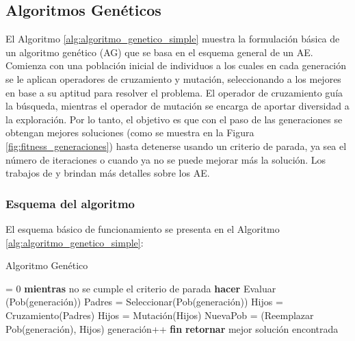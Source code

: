 \subsection{Algoritmos Genéticos}
El Algoritmo \ref{alg:algoritmo_genetico_simple} muestra la formulación básica de un algoritmo genético (AG) que se basa en el esquema general de un AE. Comienza con una población inicial de individuos a los cuales en cada generación se le aplican operadores de cruzamiento y mutación, seleccionando a los mejores en base a su aptitud para resolver el problema. El operador de cruzamiento guía la búsqueda, mientras el operador de mutación se encarga de aportar diversidad a la exploración. Por lo tanto, el objetivo es que con el paso de las generaciones se obtengan mejores soluciones (como se muestra en la Figura \ref{fig:fitness_generaciones}) hasta detenerse usando un criterio de parada, ya sea el número de iteraciones o cuando ya no se puede mejorar más la solución. Los trabajos de \citet{Goldberg1989} y \citet{Mitchell1996} brindan más detalles sobre los AE.

\subsubsection{Esquema del algoritmo}

El esquema básico de funcionamiento se presenta en el Algoritmo \ref{alg:algoritmo_genetico_simple}:


\begin{algorithm}[ht]
	\caption{Algoritmo Genético}
	\label{alg:algoritmo_genetico_simple}
	\begin{algorithmic} [1] 
		{
			 = 0
			\STATE \textbf{mientras} {no se cumple el criterio de parada} \textbf{hacer}
			\STATE\hspace{\algorithmicindent} {Evaluar (Pob(generación))}
			\STATE\hspace{\algorithmicindent} {Padres = Seleccionar(Pob(generación))}
			\STATE\hspace{\algorithmicindent} {Hijos = Cruzamiento(Padres)}
			\STATE\hspace{\algorithmicindent} {Hijos = Mutación(Hijos)}
			\STATE\hspace{\algorithmicindent} {NuevaPob = (Reemplazar Pob(generación), Hijos)}
			\STATE\hspace{\algorithmicindent} {generación}++
			\STATE \textbf{fin}
			\STATE \textbf{retornar} mejor solución encontrada
		}
	\end{algorithmic}
\end{algorithm}


